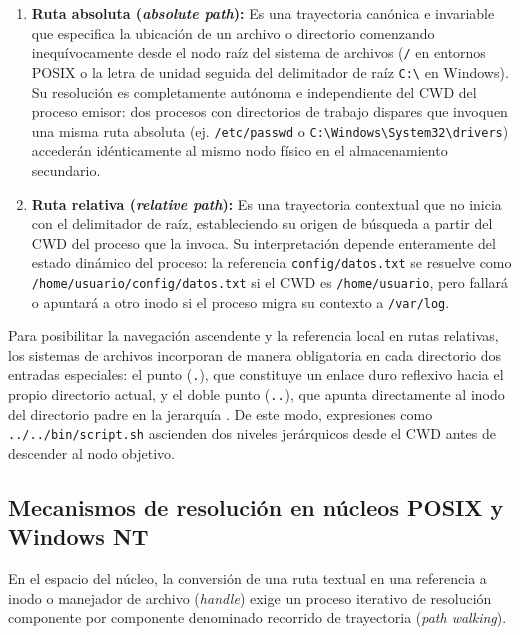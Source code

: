\documentclass[12pt]{article}
\begin{document}
\begin{enumerate}[noitemsep, topsep=2pt]
    \item \textbf{Ruta absoluta (\textit{absolute path}):} Es una trayectoria canónica e invariable que especifica la ubicación de un archivo o directorio comenzando inequívocamente desde el nodo raíz del sistema de archivos (\texttt{/} en entornos POSIX o la letra de unidad seguida del delimitador de raíz \texttt{C:\textbackslash} en Windows). Su resolución es completamente autónoma e independiente del CWD del proceso emisor: dos procesos con directorios de trabajo dispares que invoquen una misma ruta absoluta (ej. \texttt{/etc/passwd} o \texttt{C:\textbackslash Windows\textbackslash System32\textbackslash drivers}) accederán idénticamente al mismo nodo físico en el almacenamiento secundario.
    \item \textbf{Ruta relativa (\textit{relative path}):} Es una trayectoria contextual que no inicia con el delimitador de raíz, estableciendo su origen de búsqueda a partir del CWD del proceso que la invoca. Su interpretación depende enteramente del estado dinámico del proceso: la referencia \texttt{config/datos.txt} se resuelve como \texttt{/home/usuario/config/datos.txt} si el CWD es \texttt{/home/usuario}, pero fallará o apuntará a otro inodo si el proceso migra su contexto a \texttt{/var/log}.
\end{enumerate}

Para posibilitar la navegación ascendente y la referencia local en rutas relativas, los sistemas de archivos incorporan de manera obligatoria en cada directorio dos entradas especiales: el punto (\texttt{.}), que constituye un enlace duro reflexivo hacia el propio directorio actual, y el doble punto (\texttt{..}), que apunta directamente al inodo del directorio padre en la jerarquía \parencite[\S 10.3, p.\ 343]{silberschatz2006fundamentos}. De este modo, expresiones como \texttt{../../bin/script.sh} ascienden dos niveles jerárquicos desde el CWD antes de descender al nodo objetivo.

\subsection{Mecanismos de resolución en núcleos POSIX y Windows NT}
\label{subsec:mecanismosResolucionNucleos}

En el espacio del núcleo, la conversión de una ruta textual en una referencia a inodo o manejador de archivo (\textit{handle}) exige un proceso iterativo de resolución componente por componente denominado recorrido de trayectoria (\textit{path walking}).
\end{document}
